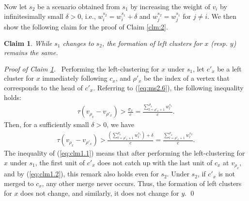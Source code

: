 \documentclass[a4paper]{llncs}
\newtheorem{clm}{Claim}
\begin{document}
Now let $s_2$ be a scenario obtained from $s_1$ by increasing the weight of $v_i$ by infinitesimally small $\delta > 0$, 
i.e., $w^{s_2}_i=w^{s_1}_i+\delta$ and $w^{s_2}_j=w^{s_1}_j$ for $j \not= i$.
We then show the following claim for the proof of Claim \ref{clm:2}.
\begin{clm}
While $s_1$ changes to $s_2$, 
the formation of left clusters for $x$ (resp. $y$) remains the same.
\label{clm:1}
\end{clm}
{\it Proof of Claim \ref{clm:1}.}  \
Performing the left-clustering for $x$ under $s_1$,
let $c'_x$ be a left cluster for $x$ immediately following $c_x$,
and $\rho'_x$
be the index of a vertex that corresponds to the head of $c'_x$.
Referring to (\ref{eq:ms2.6}), the following inequality holds:
\begin{eqnarray}
\tau(v_{\rho_x} - v_{\rho'_x}) > \frac{\sigma_x}{c} = \frac{\sum_{l=\rho'_x+1}^{\rho_x} w^{s_1}_l}{c}.
\label{eq:clm1.1}
\end{eqnarray}
Then, for a sufficiently small $\delta>0$, we have
\begin{eqnarray}
\tau(v_{\rho_x} - v_{\rho'_x}) > \frac{(\sum_{l=\rho'_x+1}^{\rho_x} w^{s_1}_l)+\delta}{c} = \frac{\sum_{l=\rho'_x+1}^{\rho_x} w^{s_2}_l}{c}.
\label{eq:clm1.2}
\end{eqnarray}
The inequality of (\ref{eq:clm1.1}) means that after performing the left-clustering for $x$ under $s_1$, the first unit of $c'_x$ does not catch up with the last unit of $c_x$ at $v_{\rho_x}$,
and by (\ref{eq:clm1.2}), this remark also holds even for $s_2$. 
Under $s_2$, if $c'_x$ is not merged to $c_x$, any other merge never occurs.
Thus, the formation of left clusters for $x$ does not change,
and similarly, it does not change for $y$. 
\qed


\medskip
\end{document}
